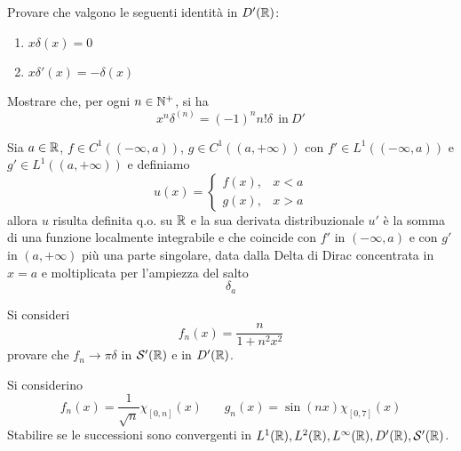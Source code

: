 Provare che valgono le seguenti identità in $D'(\mathbb{R})$:
\begin{enumerate}
\item $x\delta (x) = 0$
\item $x\delta '(x) = - \delta (x)$
\end{enumerate}

Mostrare che, per ogni $n\in \mathbb{N} ^{ + }$, si ha
\begin{equation*}
\boxed{x^{n} \delta ^{(n)} = (- 1)^{n} n!\delta \ \ \text{in} \ D'}
\end{equation*}

Sia $a\in \mathbb{R} $, $f\in C^{1}((- \infty ,a))$, $g\in C^{1}((a, + \infty))$ con $f'\in L^{1}((- \infty ,a))$ e $g'\in L^{1}((a, + \infty))$ e definiamo
\begin{equation*}
u(x) = \begin{cases}
f(x) , & x < a\\
g(x) , & x > a
\end{cases}
\end{equation*}
allora $u$ risulta definita q.o. su $\mathbb{R} $ e la sua derivata distribuzionale $u'$ è la somma di una funzione localmente integrabile e che coincide con $f'$ in $(- \infty ,a)$ e con $g'$ in $(a, + \infty)$ più una parte singolare, data dalla Delta di Dirac concentrata in $x = a$ e moltiplicata per l'ampiezza del salto
\begin{equation*}
[ u(a_{ + }) - u(a_{ - })] \delta _{a}
\end{equation*}
\Esercizio{}

Si consideri
\begin{equation*}
f_{n}(x) = \frac{n}{1 + n^{2} x^{2}}
\end{equation*}
provare che $f_{n}\rightarrow \pi \delta $ in $\mathcal{S}  '(\mathbb{R})$ e in $D'(\mathbb{R})$.
\Esercizio{}

Si considerino
\begin{equation*}
f_{n}(x) = \frac{1}{\sqrt{n}} \chi _{[ 0,n]}(x) \ \ \ \ \ \ \ \ g_{n}(x) = \sin(nx) \chi _{[ 0,7]}(x)
\end{equation*}
Stabilire se le successioni sono convergenti in $L^{1}(\mathbb{R}) ,L^{2}(\mathbb{R}) ,L^{\infty }(\mathbb{R}) ,D'(\mathbb{R}) ,\mathcal{S}  '(\mathbb{R})$.
\Esercizio{}

